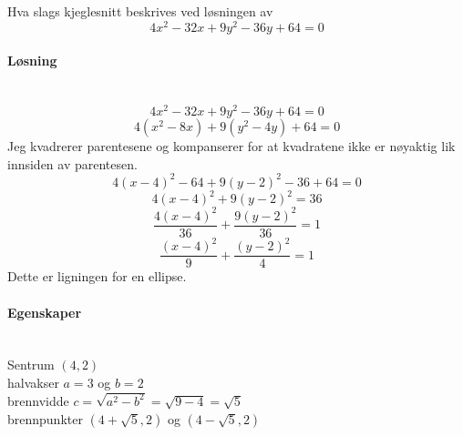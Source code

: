 Hva slags kjeglesnitt beskrives ved løsningen av
$$4x^2 - 32x + 9y^2 - 36y + 64 = 0$$

\paragraph{Løsning} \mbox{} \\
$$4x^2 - 32x + 9y^2 - 36y + 64 = 0$$
$$4(x^2-8x) + 9(y^2-4y) + 64 = 0$$
Jeg kvadrerer parentesene og kompanserer for
at kvadratene ikke er nøyaktig lik innsiden av parentesen.
$$4(x-4)^2 -64 + 9(y-2)^2 - 36 + 64 = 0$$
$$4(x-4)^2 + 9(y-2)^2  = 36$$
$$\frac{4(x-4)^2}{36} + \frac{9(y-2)^2}{36} = 1$$
$$\frac{(x-4)^2}{9} + \frac{(y-2)^2}{4} = 1$$
Dette er ligningen for en ellipse.

\paragraph{Egenskaper} \mbox{} \\
Sentrum $(4,2)$\\
halvakser $a=3$ og $b=2$\\
brennvidde $c = \sqrt{a^2 - b^2} = \sqrt{9 - 4} = \sqrt{5}$\\
brennpunkter $(4+\sqrt{5}, 2)$ og $(4-\sqrt{5}, 2)$
